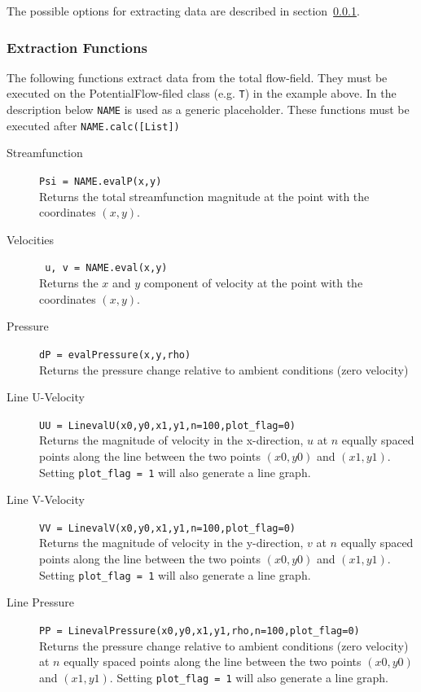 \documentclass[10pt,a4paper]{article}
\begin{document}
The possible options for extracting data are described in section~\ref{S_extract}.


\subsubsection{Extraction Functions}\label{S_extract}
The following functions extract data from the total flow-field.
They must be executed on the PotentialFlow-filed class (e.g. \verb'T') in the example above.  
In the description below \verb'NAME' is used as a generic placeholder. 
These functions must be executed after \verb'NAME.calc([List])'
\begin{description}
\item[Streamfunction] \verb'Psi = NAME.evalP(x,y)'\\
Returns the total streamfunction magnitude at the point with the coordinates $(x, y)$.

\item[Velocities] \verb' u, v = NAME.eval(x,y)' \\
Returns the $x$ and $y$ component of velocity at the point with the coordinates $(x, y)$.

\item[Pressure] \verb'dP = evalPressure(x,y,rho)'\\
Returns the pressure change relative to ambient conditions (zero velocity)

\item[Line U-Velocity] \verb'UU = LinevalU(x0,y0,x1,y1,n=100,plot_flag=0)' \\
Returns the magnitude of velocity in the x-direction, $u$ at $n$ equally spaced points along the line between the two points $(x0, y0)$ and $(x1,y1)$. 
Setting \verb'plot_flag = 1' will also generate a line graph.

\item[Line V-Velocity] \verb'VV = LinevalV(x0,y0,x1,y1,n=100,plot_flag=0)' \\
Returns the magnitude of velocity in the y-direction, $v$ at $n$ equally spaced points along the line between the two points $(x0, y0)$ and $(x1,y1)$.
Setting \verb'plot_flag = 1' will also generate a line graph.

\item[Line Pressure]  \verb'PP = LinevalPressure(x0,y0,x1,y1,rho,n=100,plot_flag=0)' \\
Returns the pressure change relative to ambient conditions (zero velocity) at $n$ equally spaced points along the line between the two points $(x0, y0)$ and $(x1,y1)$.
Setting \verb'plot_flag = 1' will also generate a line graph.

\end{description}
\end{document}
